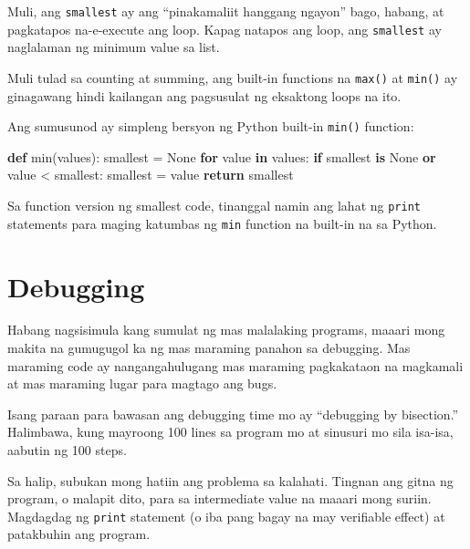 \documentclass[10pt,]{book}
\newenvironment{Shaded}{}{}
\newcommand{\BuiltInTok}[1]{\textcolor[rgb]{0.00,0.50,0.00}{#1}}
\newcommand{\ControlFlowTok}[1]{\textcolor[rgb]{0.00,0.44,0.13}{\textbf{#1}}}
\newcommand{\KeywordTok}[1]{\textcolor[rgb]{0.00,0.44,0.13}{\textbf{#1}}}
\newcommand{\NormalTok}[1]{#1}
\newcommand{\OperatorTok}[1]{\textcolor[rgb]{0.40,0.40,0.40}{#1}}
\newcommand{\VariableTok}[1]{\textcolor[rgb]{0.10,0.09,0.49}{#1}}
\begin{document}
Muli, ang \texttt{smallest} ay ang ``pinakamaliit hanggang ngayon''
bago, habang, at pagkatapos na-e-execute ang loop. Kapag natapos ang
loop, ang \texttt{smallest} ay naglalaman ng minimum value sa list.

Muli tulad sa counting at summing, ang built-in functions na
\texttt{max()} at \texttt{min()} ay ginagawang hindi kailangan ang
pagsusulat ng eksaktong loops na ito.

Ang sumusunod ay simpleng bersyon ng Python built-in \texttt{min()}
function:

\begin{Shaded}
\begin{Highlighting}[]
\KeywordTok{def} \BuiltInTok{min}\NormalTok{(values):}
\NormalTok{    smallest }\OperatorTok{=} \VariableTok{None}
    \ControlFlowTok{for}\NormalTok{ value }\KeywordTok{in}\NormalTok{ values:}
        \ControlFlowTok{if}\NormalTok{ smallest }\KeywordTok{is} \VariableTok{None} \KeywordTok{or}\NormalTok{ value }\OperatorTok{\textless{}}\NormalTok{ smallest:}
\NormalTok{            smallest }\OperatorTok{=}\NormalTok{ value}
    \ControlFlowTok{return}\NormalTok{ smallest}
\end{Highlighting}
\end{Shaded}

Sa function version ng smallest code, tinanggal namin ang lahat ng
\texttt{print} statements para maging katumbas ng \texttt{min} function
na built-in na sa Python.

\section{Debugging}\label{debugging-4}

Habang nagsisimula kang sumulat ng mas malalaking programs, maaari mong
makita na gumugugol ka ng mas maraming panahon sa debugging. Mas
maraming code ay nangangahulugang mas maraming pagkakataon na magkamali
at mas maraming lugar para magtago ang bugs.

 

Isang paraan para bawasan ang debugging time mo ay ``debugging by
bisection.'' Halimbawa, kung mayroong 100 lines sa program mo at
sinusuri mo sila isa-isa, aabutin ng 100 steps.

Sa halip, subukan mong hatiin ang problema sa kalahati. Tingnan ang
gitna ng program, o malapit dito, para sa intermediate value na maaari
mong suriin. Magdagdag ng \texttt{print} statement (o iba pang bagay na
may verifiable effect) at patakbuhin ang program.
\end{document}
